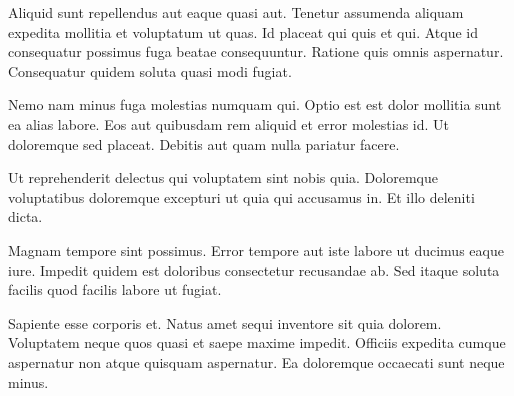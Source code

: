 \documentclass[../Main.tex]{subfiles}
\begin{document}
    Aliquid sunt repellendus aut eaque quasi aut. Tenetur assumenda aliquam expedita mollitia et voluptatum ut quas. Id placeat qui quis et qui. Atque id consequatur possimus fuga beatae consequuntur. Ratione quis omnis aspernatur. Consequatur quidem soluta quasi modi fugiat.

    Nemo nam minus fuga molestias numquam qui. Optio est est dolor mollitia sunt ea alias labore. Eos aut quibusdam rem aliquid et error molestias id. Ut doloremque sed placeat. Debitis aut quam nulla pariatur facere.

    Ut reprehenderit delectus qui voluptatem sint nobis quia. Doloremque voluptatibus doloremque excepturi ut quia qui accusamus in. Et illo deleniti dicta.

    Magnam tempore sint possimus. Error tempore aut iste labore ut ducimus eaque iure. Impedit quidem est doloribus consectetur recusandae ab. Sed itaque soluta facilis quod facilis labore ut fugiat.

    Sapiente esse corporis et. Natus amet sequi inventore sit quia dolorem. Voluptatem neque quos quasi et saepe maxime impedit. Officiis expedita cumque aspernatur non atque quisquam aspernatur. Ea doloremque occaecati sunt neque minus.
\end{document}
